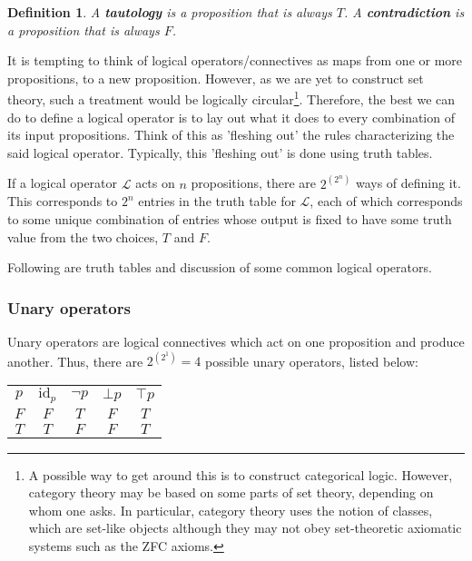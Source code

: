 \documentclass[12pt]{article}
\newtheorem{definition}{Definition}[section]
\begin{document}
\begin{definition}
A \textbf{tautology} is a proposition that is always $T$. A \textbf{contradiction} is a proposition that is always $F$.
\end{definition}

It is tempting to think of logical operators/connectives as maps from one or more propositions, to a new proposition. However, as we are yet to construct set theory, such a treatment would be logically circular\footnote{A possible way to get around this is to construct categorical logic. However, category theory may be based on some parts of set theory, depending on whom one asks. In particular, category theory uses the notion of classes, which are set-like objects although they may not obey set-theoretic axiomatic systems such as the ZFC axioms.}. Therefore, the best we can do to define a logical operator is to lay out what it does to every combination of its input propositions. Think of this as 'fleshing out' the rules characterizing the said logical operator. Typically, this 'fleshing out' is done using truth tables.

If a logical operator $\mathcal{L}$ acts on $n$ propositions, there are $2^{\left( 2^n \right)}$ ways of defining it. This corresponds to $2^n$ entries in the truth table for $\mathcal{L}$, each of which corresponds to some unique combination of entries whose output is fixed to have some truth value from the two choices, $T$ and $F$.

Following are truth tables and discussion of some common logical operators.

\clearpage

\subsubsection{Unary operators}

Unary operators are logical connectives which act on one proposition and produce another. Thus, there are $2^{\left( 2^1 \right)} = 4$ possible unary operators, listed below:

\begin{center}
\begin{tabular}{|c||c|c|c|c|}
\hline 
$p$ & $\text{id}_p$ & $\lnot p$ & $\bot p$ & $\top p$ \\
\hhline{|=||=|=|=|=|}
$F$ & $F$ & $T$ & $F$ & $T$ \\
\hline
$T$ & $T$ & $F$ & $F$ & $T$ \\
\hline
\end{tabular}
\end{center}
\end{document}
